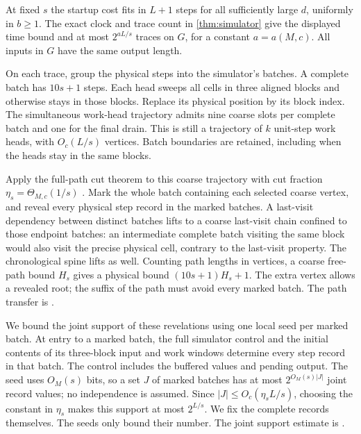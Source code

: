 \begin{outline}
At fixed $s$ the startup cost fits in $L+1$ steps for all
sufficiently large $d$, uniformly in $b\ge1$. The exact clock and trace
count in \cref{thm:simulator} give the displayed time bound and at most
$2^{aL/s}$ traces on $G$, for a constant $a=a(M,c)$. All inputs in $G$
have the same output length.

On each trace, group the physical steps into the simulator's batches.
A complete batch has $10s+1$ steps. Each head sweeps all cells in three
aligned blocks and otherwise stays in those blocks. Replace its physical
position by its block index. The simultaneous work-head trajectory admits
nine coarse slots per complete batch and one for the final drain. This
is still a trajectory of $k$ unit-step work heads, with $O_c(L/s)$
vertices. Batch boundaries are retained, including when the heads stay
in the same blocks.

Apply the full-path cut theorem to this coarse trajectory with cut
fraction $\eta_s=\Theta_{M,c}(1/s)$
\cite[Definition~7.1 and Corollary~9.3(a)]{PaperFourteen}. Mark the
whole batch containing each selected coarse vertex, and reveal every
physical step record in the marked batches. A last-visit dependency
between distinct batches lifts to a coarse last-visit chain confined to
those endpoint batches: an intermediate complete batch visiting the same
block would also visit the precise physical cell, contrary to the
last-visit property. The chronological spine lifts as well. Counting
path lengths in vertices, a coarse free-path bound $H_s$ gives a physical bound
$(10s+1)H_s+1$. The extra vertex allows a revealed root; the suffix of
the path must avoid every marked batch. The path transfer is
.

We bound the joint support of these revelations using one local seed
per marked batch. At entry to a marked batch, the full simulator
control and the initial contents of its three-block input and work
windows determine every step record in that batch. The control includes
the buffered values and pending output. The seed uses $O_M(s)$ bits, so
a set $J$ of marked batches has at most $2^{O_M(s)|J|}$ joint record values;
no independence is assumed. Since $|J|\le O_c(\eta_s L/s)$, choosing
the constant in $\eta_s$ makes this support at most $2^{L/s}$. We fix
the complete records themselves. The seeds only bound their number.
The joint support estimate is
.


\end{outline}
